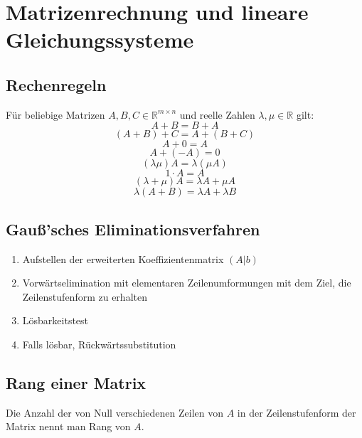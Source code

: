 \documentclass[a4paper,twocolumn,10pt]{article}
\begin{document}
\section{Matrizenrechnung und lineare Gleichungssysteme}

\subsection{Rechenregeln}
Für beliebige Matrizen $A,B,C\in \mathbb{R}^{m\times n}$ und reelle Zahlen $\lambda,\mu\in \mathbb{R}$ gilt:\\
\begin{equation*}
A+B=B+A
\end{equation*}
\begin{equation*}
(A+B)+C=A+(B+C)
\end{equation*}
\begin{equation*}
A+0=A
\end{equation*}
\begin{equation*}
A+(-A)=0
\end{equation*}
\begin{equation*}
(\lambda\mu)A=\lambda(\mu A)
\end{equation*}
\begin{equation*}
1\cdot A=A
\end{equation*}
\begin{equation*}
(\lambda+\mu)A=\lambda A+\mu A
\end{equation*}
\begin{equation*}
\lambda(A+B)=\lambda A+\lambda B
\end{equation*}

\subsection{Gauß'sches Eliminationsverfahren}
\begin{enumerate}
\item Aufstellen der erweiterten Koeffizientenmatrix $(A|b)$
\item Vorwärtselimination mit elementaren Zeilenumformungen mit dem Ziel, die Zeilenstufenform zu erhalten
\item Lösbarkeitstest
\item Falls lösbar, Rückwärtssubstitution
\end{enumerate}

\subsection{Rang einer Matrix}
Die Anzahl der von Null verschiedenen Zeilen von $A$ in der Zeilenstufenform der Matrix nennt man Rang von $A$.
\end{document}
